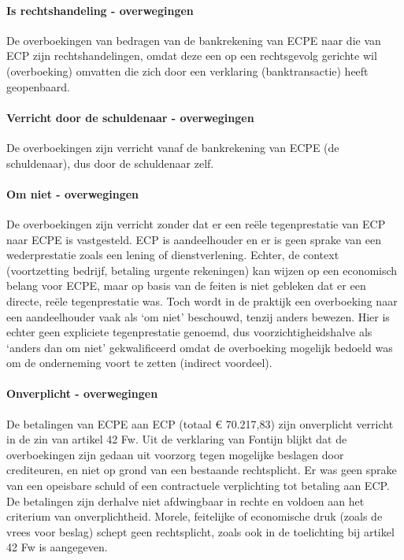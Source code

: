 \documentclass[
  dutch,
  a4paper,
]{article}
\begin{document}
\paragraph{Is rechtshandeling - overwegingen}\label{is-rechtshandeling---overwegingen-45}

De overboekingen van bedragen van de bankrekening van ECPE naar die van ECP zijn rechtshandelingen, omdat deze een op een rechtsgevolg gerichte wil (overboeking) omvatten die zich door een verklaring (banktransactie) heeft geopenbaard.

\paragraph{Verricht door de schuldenaar - overwegingen}\label{verricht-door-de-schuldenaar---overwegingen-45}

De overboekingen zijn verricht vanaf de bankrekening van ECPE (de schuldenaar), dus door de schuldenaar zelf.

\paragraph{Om niet - overwegingen}\label{om-niet---overwegingen-45}

De overboekingen zijn verricht zonder dat er een reële tegenprestatie van ECP naar ECPE is vastgesteld. ECP is aandeelhouder en er is geen sprake van een wederprestatie zoals een lening of dienstverlening. Echter, de context (voortzetting bedrijf, betaling urgente rekeningen) kan wijzen op een economisch belang voor ECPE, maar op basis van de feiten is niet gebleken dat er een directe, reële tegenprestatie was. Toch wordt in de praktijk een overboeking naar een aandeelhouder vaak als `om niet' beschouwd, tenzij anders bewezen. Hier is echter geen expliciete tegenprestatie genoemd, dus voorzichtigheidshalve als `anders dan om niet' gekwalificeerd omdat de overboeking mogelijk bedoeld was om de onderneming voort te zetten (indirect voordeel).

\paragraph{Onverplicht - overwegingen}\label{onverplicht---overwegingen-45}

De betalingen van ECPE aan ECP (totaal € 70.217,83) zijn onverplicht verricht in de zin van artikel 42 Fw. Uit de verklaring van Fontijn blijkt dat de overboekingen zijn gedaan uit voorzorg tegen mogelijke beslagen door crediteuren, en niet op grond van een bestaande rechtsplicht. Er was geen sprake van een opeisbare schuld of een contractuele verplichting tot betaling aan ECP. De betalingen zijn derhalve niet afdwingbaar in rechte en voldoen aan het criterium van onverplichtheid. Morele, feitelijke of economische druk (zoals de vrees voor beslag) schept geen rechtsplicht, zoals ook in de toelichting bij artikel 42 Fw is aangegeven.
\end{document}
